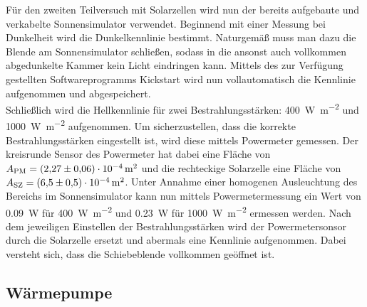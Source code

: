 \documentclass[english, ngerman]{scrartcl}
\begin{document}
Für den zweiten Teilversuch mit Solarzellen wird nun der bereits aufgebaute und verkabelte Sonnensimulator verwendet. Beginnend mit einer Messung bei Dunkelheit wird die Dunkelkennlinie bestimmt. Naturgemäß muss man dazu die Blende am Sonnensimulator schließen, sodass in die ansonst auch vollkommen abgedunkelte Kammer kein Licht eindringen kann. Mittels des zur Verfügung gestellten Softwareprogramms \glq Kickstart \grq wird nun vollautomatisch die Kennlinie aufgenommen und abgespeichert.\\
Schließlich wird die Hellkennlinie für zwei Bestrahlungsstärken: \SI{400}{\watt\per\meter\squared} und \SI{1000}{\watt\per\meter\squared} aufgenommen. Um sicherzustellen, dass die korrekte Bestrahlungsstärken eingestellt ist, wird diese mittels Powermeter gemessen. Der kreisrunde Sensor des Powermeter hat dabei eine Fläche von $A_{\text{PM}} = \SI{2.27(6)e-4}{m\squared}$ und die rechteckige Solarzelle eine Fläche von $A_{\text{SZ}} = \SI{6.5(5)e-4}{m\squared}$. Unter Annahme einer homogenen Ausleuchtung des Bereichs im Sonnensimulator kann nun mittels Powermetermessung ein Wert von \SI{0,09}{\watt} für \SI{400}{\watt\per\meter\squared} und \SI{0,23}{\watt} für \SI{1000}{\watt\per\meter\squared} ermessen werden. Nach dem jeweiligen Einstellen der Bestrahlungsstärken wird der Powermetersonsor durch die Solarzelle ersetzt und abermals eine Kennlinie aufgenommen. Dabei versteht sich, dass die Schiebeblende vollkommen geöffnet ist.


\subsection{Wärmepumpe}
\label{subsec:durchfuehrung_waermepumpe}
\end{document}
